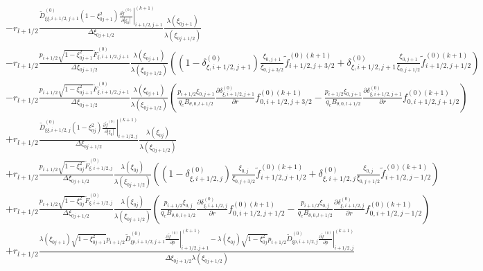 \begin{eqnarray*}
 &  & -r_{l+1/2}\frac{\widetilde{D}_{\xi\xi,i+1/2,j+1}^{\left(0\right)}\left(1-\xi_{0j+1}^{2}\right)\left.\frac{\partial\widetilde{f}^{\left(0\right)}}{\partial\left|\xi_{0}\right|}\right|_{i+1/2,j+1}^{(k+1)}}{\Delta\xi_{0j+1/2}}\frac{\lambda\left(\xi_{0j+1}\right)}{\lambda\left(\xi_{0j+1/2}\right)}\\
 &  & -r_{l+1/2}\frac{p_{i+1/2}\sqrt{1-\xi_{0j+1}^{2}}\widetilde{F}_{\xi,i+1/2,j+1}^{\left(0\right)}}{\Delta\xi_{0j+1/2}}\frac{\lambda\left(\xi_{0j+1}\right)}{\lambda\left(\xi_{0j+1/2}\right)}\left(\left(1-\delta_{\xi,i+1/2,j+1}^{(0)}\right)\frac{\xi_{0,j+1}}{\xi_{0,j+3/2}}\widetilde{f}_{i+1/2,j+3/2}^{\left(0\right)(k+1)}+\delta_{\xi,i+1/2,j+1}^{(0)}\frac{\xi_{0,j+1}}{\xi_{0,j+1/2}}\widetilde{f}_{i+1/2,j+1/2}^{\left(0\right)(k+1)}\right)\\
 &  & -r_{l+1/2}\frac{p_{i+1/2}\sqrt{1-\xi_{0j+1}^{2}}\widetilde{F}_{\xi,i+1/2,j+1}^{\left(0\right)}}{\Delta\xi_{0j+1/2}}\frac{\lambda\left(\xi_{0j+1}\right)}{\lambda\left(\xi_{0j+1/2}\right)}\left(\frac{p_{i+1/2}\xi_{0,j+1}}{q_{e}B_{\theta,0,l+1/2}}\frac{\partial\delta_{\xi,i+1/2,j+1}^{(0)}}{\partial r}f_{0,i+1/2,j+3/2}^{\left(0\right)(k+1)}-\frac{p_{i+1/2}\xi_{0,j+1}}{q_{e}B_{\theta,0,l+1/2}}\frac{\partial\delta_{\xi,i+1/2,j+1}^{(0)}}{\partial r}f_{0,i+1/2,j+1/2}^{\left(0\right)(k+1)}\right)\\
 &  & +r_{l+1/2}\frac{\widetilde{D}_{\xi\xi,i+1/2,j}^{\left(0\right)}\left(1-\xi_{0j}^{2}\right)\left.\frac{\partial\widetilde{f}^{\left(0\right)}}{\partial\left|\xi_{0}\right|}\right|_{i+1/2,j}^{(k+1)}}{\Delta\xi_{0j+1/2}}\frac{\lambda\left(\xi_{0j}\right)}{\lambda\left(\xi_{0j+1/2}\right)}\\
 &  & +r_{l+1/2}\frac{p_{i+1/2}\sqrt{1-\xi_{0j}^{2}}\widetilde{F}_{\xi,i+1/2,j}^{\left(0\right)}}{\Delta\xi_{0j+1/2}}\frac{\lambda\left(\xi_{0j}\right)}{\lambda\left(\xi_{0j+1/2}\right)}\left(\left(1-\delta_{\xi,i+1/2,j}^{(0)}\right)\frac{\xi_{0,j}}{\xi_{0,j+3/2}}\widetilde{f}_{i+1/2,j+1/2}^{\left(0\right)(k+1)}+\delta_{\xi,i+1/2,j}^{(0)}\frac{\xi_{0,j}}{\xi_{0,j+1/2}}\widetilde{f}_{i+1/2,j-1/2}^{\left(0\right)(k+1)}\right)\\
 &  & +r_{l+1/2}\frac{p_{i+1/2}\sqrt{1-\xi_{0j}^{2}}\widetilde{F}_{\xi,i+1/2,j}^{\left(0\right)}}{\Delta\xi_{0j+1/2}}\frac{\lambda\left(\xi_{0j}\right)}{\lambda\left(\xi_{0j+1/2}\right)}\left(\frac{p_{i+1/2}\xi_{0,j}}{q_{e}B_{\theta,0,l+1/2}}\frac{\partial\delta_{\xi,i+1/2,j}^{(0)}}{\partial r}f_{0,i+1/2,j+1/2}^{\left(0\right)(k+1)}-\frac{p_{i+1/2}\xi_{0,j}}{q_{e}B_{\theta,0,l+1/2}}\frac{\partial\delta_{\xi,i+1/2,j}^{(0)}}{\partial r}f_{0,i+1/2,j-1/2}^{\left(0\right)(k+1)}\right)\\
 &  & +r_{l+1/2}\frac{\lambda\left(\xi_{0j+1}\right)\sqrt{1-\xi_{0j+1}^{2}}p_{i+1/2}\widetilde{D}_{\xi p,i+1/2,j+1}^{\left(0\right)}\left.\frac{\partial\widetilde{f}^{\left(0\right)}}{\partial p}\right|_{i+1/2,j+1}^{(k+1)}-\lambda\left(\xi_{0j}\right)\sqrt{1-\xi_{0j}^{2}}p_{i+1/2}\widetilde{D}_{\xi p,i+1/2,j}^{\left(0\right)}\left.\frac{\partial\widetilde{f}^{\left(0\right)}}{\partial p}\right|_{i+1/2,j}^{(k+1)}}{\Delta\xi_{0j+1/2}\lambda\left(\xi_{0j+1/2}\right)}\end{eqnarray*}


